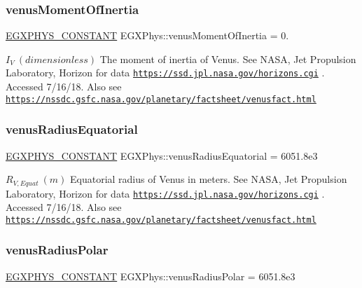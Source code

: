 \subsubsection{\texorpdfstring{venus\+Moment\+Of\+Inertia}{venusMomentOfInertia}}
{\footnotesize\ttfamily \mbox{\hyperlink{group___e_g_x_phys-_constants-_macros_ga76980d288494ce1714c9ac68a95ba702}{E\+G\+X\+P\+H\+Y\+S\+\_\+\+C\+O\+N\+S\+T\+A\+NT}} E\+G\+X\+Phys\+::venus\+Moment\+Of\+Inertia = 0.}

$ I_{V} \ (dimensionless)$ The moment of inertia of Venus. See N\+A\+SA, Jet Propulsion Laboratory, Horizon for data \href{https://ssd.jpl.nasa.gov/horizons.cgi}{\tt https\+://ssd.\+jpl.\+nasa.\+gov/horizons.\+cgi} . Accessed 7/16/18. Also see \href{https://nssdc.gsfc.nasa.gov/planetary/factsheet/venusfact.html}{\tt https\+://nssdc.\+gsfc.\+nasa.\+gov/planetary/factsheet/venusfact.\+html} \mbox{\label{group___e_g_x_phys-_constants-_astrophysics-_solar_system-_venus-_bulk_gab2414fa95cfd785f97810f384d9c3554}} 
\subsubsection{\texorpdfstring{venus\+Radius\+Equatorial}{venusRadiusEquatorial}}
{\footnotesize\ttfamily \mbox{\hyperlink{group___e_g_x_phys-_constants-_macros_ga76980d288494ce1714c9ac68a95ba702}{E\+G\+X\+P\+H\+Y\+S\+\_\+\+C\+O\+N\+S\+T\+A\+NT}} E\+G\+X\+Phys\+::venus\+Radius\+Equatorial = 6051.\+8e3}

$R_{V,Equat} \ (m)$ Equatorial radius of Venus in meters. See N\+A\+SA, Jet Propulsion Laboratory, Horizon for data \href{https://ssd.jpl.nasa.gov/horizons.cgi}{\tt https\+://ssd.\+jpl.\+nasa.\+gov/horizons.\+cgi} . Accessed 7/16/18. Also see \href{https://nssdc.gsfc.nasa.gov/planetary/factsheet/venusfact.html}{\tt https\+://nssdc.\+gsfc.\+nasa.\+gov/planetary/factsheet/venusfact.\+html} \mbox{\label{group___e_g_x_phys-_constants-_astrophysics-_solar_system-_venus-_bulk_gaa2e9fd69a5627d4eb46749d8245bf9c0}} 
\subsubsection{\texorpdfstring{venus\+Radius\+Polar}{venusRadiusPolar}}
{\footnotesize\ttfamily \mbox{\hyperlink{group___e_g_x_phys-_constants-_macros_ga76980d288494ce1714c9ac68a95ba702}{E\+G\+X\+P\+H\+Y\+S\+\_\+\+C\+O\+N\+S\+T\+A\+NT}} E\+G\+X\+Phys\+::venus\+Radius\+Polar = 6051.\+8e3}

